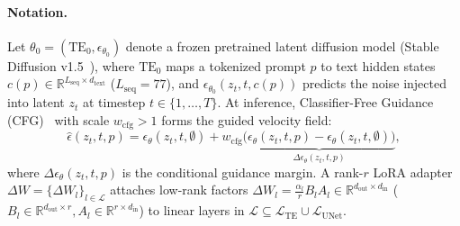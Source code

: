 \documentclass[10pt,twocolumn,letterpaper]{article}
\newcommand{\R}{\mathbb{R}}
\begin{document}
\paragraph{Notation.}
Let $\theta_0 = (\text{TE}_0, \epsilon_{\theta_0})$ denote a frozen pretrained latent diffusion model (Stable Diffusion v1.5~\cite{rombach2022high}), where $\text{TE}_0$ maps a tokenized prompt $p$ to text hidden states $c(p) \in \R^{L_{\text{seq}} \times d_{\text{text}}}$ ($L_{\text{seq}}=77$), and $\epsilon_{\theta_0}(z_t, t, c(p))$ predicts the noise injected into latent $z_t$ at timestep $t \in \{1,\dots,T\}$. At inference, Classifier-Free Guidance (CFG)~\cite{ho2022cfg} with scale $w_{\text{cfg}} > 1$ forms the guided velocity field:
\begin{equation}
    \hat{\epsilon}(z_t, t, p) = \epsilon_\theta(z_t, t, \emptyset) + w_{\text{cfg}} \underbrace{\big(\epsilon_\theta(z_t, t, p) - \epsilon_\theta(z_t, t, \emptyset)\big)}_{\Delta\epsilon_\theta(z_t, t, p)},
    \label{eq:cfg_field}
\end{equation}
where $\Delta\epsilon_\theta(z_t, t, p)$ is the conditional guidance margin. A rank-$r$ LoRA adapter $\Delta W = \{\Delta W_l\}_{l \in \mathcal{L}}$ attaches low-rank factors $\Delta W_l = \frac{\alpha_l}{r} B_l A_l \in \R^{d_{\text{out}} \times d_{\text{in}}}$ ($B_l \in \R^{d_{\text{out}} \times r}, A_l \in \R^{r \times d_{\text{in}}}$) to linear layers in $\mathcal{L} \subseteq \mathcal{L}_{\text{TE}} \cup \mathcal{L}_{\text{UNet}}$.
\end{document}

